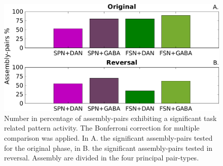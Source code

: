 \begin{figure}
    \centering
    \includegraphics[scale=0.55]{figures/PercFriedHitTrialsBFf.png}
    \caption{Number in percentage of assembly-pairs exhibiting a significant task related pattern activity. The Bonferroni correction for multiple comparison was applied. In A. the significant assembly-pairs tested for the original phase, in B. the significant assembly-pairs tested in reversal. Assembly are divided in the four principal pair-types.}
    \label{fig:PercAsFried}
\end{figure}
